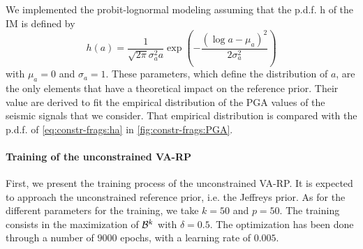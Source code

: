 We implemented the probit-lognormal modeling assuming that the p.d.f. h of the IM is defined by
    \begin{equation}\label{eq:constr-frags:ha}
        h(a) = \frac{1}{\sqrt{2\pi}\sigma_a^2 a}\exp\left(-\frac{(\log a-\mu_a)^2}{2\sigma_a^2}\right)
    \end{equation}
with
$\mu_a=0$ and $\sigma_a=1$. These parameters, which define the distribution of $a$, are the only elements that have a theoretical impact on the reference prior.
Their value are derived to fit the empirical distribution of the PGA values of the seismic signals that we consider. That empirical distribution is compared with the p.d.f. of \cref{eq:constr-frags:ha} in \cref{fig:constr-frags:PGA}.





\paragraph{Training of the unconstrained VA-RP}
First, we present the training process of the unconstrained VA-RP. It is expected to approach the unconstrained reference prior, i.e. the Jeffreys prior. 
As for the different parameters 
for the training, we take $k=50$ and $p=50$. The training consists in the maximization of $\mathcal{B}^k$ with $\delta=0.5$. 
The optimization has been done through a number of $9000$ epochs, with a learning rate of $0.005$.


